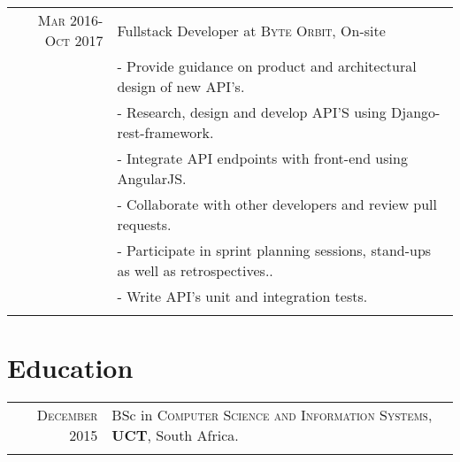 \documentclass[a4paper,10pt]{article} %
\begin{document}
\begin{tabular}{r|p{15cm}}

\textsc{Mar 2016-Oct 2017} & Fullstack Developer at \textsc{Byte Orbit}, On-site \emph{}\\
& \footnotesize{- Provide guidance on product and architectural design of new API’s.}\\
& \footnotesize{- Research, design and develop API’S using Django-rest-framework.}\\
& \footnotesize{- Integrate API endpoints with front-end using AngularJS.}\\
& \footnotesize{- Collaborate with other developers and review pull requests.}\\
& \footnotesize{- Participate in sprint planning sessions, stand-ups as well as retrospectives..}\\
& \footnotesize{- Write API’s unit and integration tests.}\\
\multicolumn{2}{c}{} \\
\end{tabular}







\section{Education}

\begin{tabular}{rl}	
\textsc{December} 2015 & BSc in \textsc{Computer Science and Information Systems}, \textbf{UCT}, South Africa.\\
&\\
\end{tabular}
\end{document}
